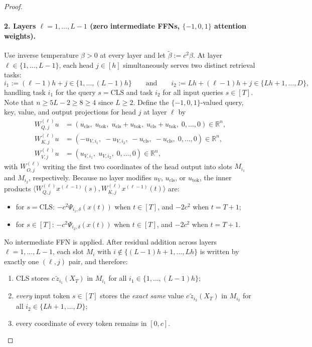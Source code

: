 \documentclass[11pt]{article}
\theoremstyle{plain}
\theoremstyle{definition}
\theoremstyle{remark}
\newcommand{\R}{\mathbb{R}}
\newcommand{\1}{\mathbf{1}}
\newcommand{\CLS}{\mathrm{CLS}}
\newcommand{\tok}{\mathrm{tok}}
\newcommand{\cls}{\mathrm{cls}}
\begin{document}
\begin{proof}
\paragraph{2. Layers $\ell = 1, \dots, L - 1$ (zero intermediate FFNs, $\{-1, 0, 1\}$ attention weights).}
Use inverse temperature $\beta > 0$ at every layer and let $\tilde{\beta} := c^2 \beta$. At layer $\ell \in \{1, \dots, L-1\}$, each head $j \in [h]$ simultaneously serves two distinct retrieval tasks:
\[
i_1 := (\ell - 1)h + j \in \{1, \dots, (L-1)h\}
\qquad\text{and}\qquad
i_2 := Lh + (\ell - 1)h + j \in \{Lh + 1, \dots, D\},
\]
handling task $i_1$ for the query $s = \CLS$ and task $i_2$ for all input queries $s \in [T]$. Note that $n \ge 5L - 2 \ge 8 \ge 4$ since $L \ge 2$. Define the $\{-1,0,1\}$-valued query, key, value, and output projections for head $j$ at layer $\ell$ by
\begin{align*}
W_{Q,j}^{(\ell)} u &= (u_{\cls},\; u_{\tok},\; u_{\cls} + u_{\tok},\; u_{\cls} + u_{\tok},\; 0, \dots, 0) \in \R^n, \\
W_{K,j}^{(\ell)} u &= (-u_{V,i_1},\; -u_{V,i_2},\; -u_{\cls},\; -u_{\cls},\; 0, \dots, 0) \in \R^n, \\
W_{V,j}^{(\ell)} u &= (u_{V,i_1},\; u_{V,i_2},\; 0, \dots, 0) \in \R^n,
\end{align*}
with $W_{O,j}^{(\ell)}$ writing the first two coordinates of the head output into slots $M_{i_1}$ and $M_{i_2}$, respectively. Because no layer modifies $u_V$, $u_{\cls}$, or $u_{\tok}$, the inner products $\langle W_{Q,j}^{(\ell)} x^{(\ell-1)}(s), W_{K,j}^{(\ell)} x^{(\ell-1)}(t)\rangle$ are:
\begin{itemize}[leftmargin=2em,itemsep=1pt]
    \item for $s = \CLS$: $-c^2 \Psi_{i_1,\delta}(x(t))$ when $t \in [T]$, and $-2c^2$ when $t = T+1$;
    \item for $s \in [T]$: $-c^2 \Psi_{i_2,\delta}(x(t))$ when $t \in [T]$, and $-2c^2$ when $t = T+1$.
\end{itemize}
No intermediate FFN is applied. After residual addition across layers $\ell = 1, \dots, L-1$, each slot $M_i$ with $i \notin \{(L-1)h+1, \dots, Lh\}$ is written by exactly one $(\ell, j)$ pair, and therefore:
\begin{enumerate}[label=(\alph*),leftmargin=2.2em,itemsep=1pt]
    \item $\CLS$ stores $c\,\tilde{z}_{i_1}(X_T)$ in $M_{i_1}$ for all $i_1 \in \{1, \dots, (L-1)h\}$;
    \item \emph{every} input token $s \in [T]$ stores the \emph{exact same} value $c\,\tilde{z}_{i_2}(X_T)$ in $M_{i_2}$ for all $i_2 \in \{Lh + 1, \dots, D\}$;
    \item every coordinate of every token remains in $[0,c]$.
\end{enumerate}


\end{proof}
\end{document}

